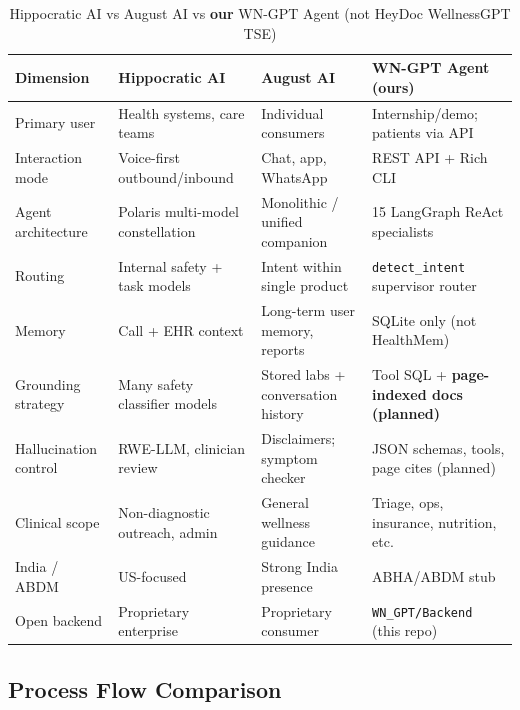 \documentclass[12pt,a4paper]{article}
\begin{document}
\begin{table}[H]
\centering
\footnotesize
\renewcommand{\arraystretch}{1.45}
\begin{tabularx}{\linewidth}{@{}p{2.4cm}XXX@{}}
\toprule
\textbf{Dimension} & \textbf{Hippocratic AI} & \textbf{August AI} & \textbf{WN-GPT Agent (ours)} \\
\midrule
Primary user & Health systems, care teams & Individual consumers & Internship/demo; patients via API \\
Interaction mode & Voice-first outbound/inbound & Chat, app, WhatsApp & REST API + Rich CLI \\
Agent architecture & Polaris multi-model constellation & Monolithic / unified companion & 15 LangGraph ReAct specialists \\
Routing & Internal safety + task models & Intent within single product & \texttt{detect\_intent} supervisor router \\
Memory & Call + EHR context & Long-term user memory, reports & SQLite only (not HealthMem) \\
Grounding strategy & Many safety classifier models & Stored labs + conversation history & Tool SQL + \textbf{page-indexed docs (planned)} \\
Hallucination control & RWE-LLM, clinician review & Disclaimers; symptom checker & JSON schemas, tools, page cites (planned) \\
Clinical scope & Non-diagnostic outreach, admin & General wellness guidance & Triage, ops, insurance, nutrition, etc. \\
India / ABDM & US-focused & Strong India presence & ABHA/ABDM stub \\
Open backend & Proprietary enterprise & Proprietary consumer & \texttt{WN\_GPT/Backend} (this repo) \\
\bottomrule
\end{tabularx}
\caption{Hippocratic AI vs August AI vs \textbf{our} WN-GPT Agent (not HeyDoc WellnessGPT TSE)}
\end{table}

\subsection{Process Flow Comparison}
\end{document}
